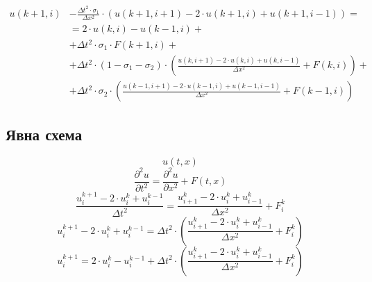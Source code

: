 \documentclass{article}
\begin{document}
            \begin{align*}
                u(k+1, i) & - \frac{\Delta{t}^2 \cdot \sigma_1}{\Delta{x}^2} \cdot \left(u(k+1, i+1) - 2 \cdot u(k+1, i) + u(k+1, i-1)\right) = \\
                & = 2 \cdot u(k, i) - u(k-1, i)  + \\
                & + \Delta{t}^2 \cdot \sigma_1 \cdot F(k+1, i) + \\
                & + \Delta{t}^2 \cdot \left(1 - \sigma_1 - \sigma_2 \right) \cdot \left(\frac{u(k, i+1) - 2 \cdot u(k, i) + u(k, i-1)}{\Delta{x}^2} + F(k, i)\right) + \\
                & + \Delta{t}^2 \cdot \sigma_2 \cdot \left(\frac{u(k-1, i+1) - 2 \cdot u(k-1, i) + u(k-1, i-1)}{\Delta{x}^2} + F(k-1, i)\right)
            \end{align*}

        \subsection{Явна схема}
            \label{subsec:straight}
            $$ u(t, x) $$
            $$ \frac{\partial^2{u}}{\partial{t^2}} = \frac{\partial^2{u}}{\partial{x^2}} + F(t, x) $$
            $$ \frac{u_i^{k+1} - 2 \cdot u_i^{k} + u_i^{k-1}}{\Delta{t}^2} = \frac{u_{i+1}^{k} - 2 \cdot u_i^{k} + u_{i-1}^{k}}{\Delta{x}^2} + F_i^{k} $$
            $$ u_i^{k+1} - 2 \cdot u_i^{k} + u_i^{k-1} = \Delta{t}^2 \cdot \left( \frac{u_{i+1}^{k} - 2 \cdot u_i^{k} + u_{i-1}^{k}}{\Delta{x}^2} + F_i^{k} \right) $$
            $$ u_i^{k+1} = 2 \cdot u_i^{k} - u_i^{k-1} + \Delta{t}^2 \cdot \left( \frac{u_{i+1}^{k} - 2 \cdot u_i^{k} + u_{i-1}^{k}}{\Delta{x}^2} + F_i^{k} \right) $$
\end{document}
